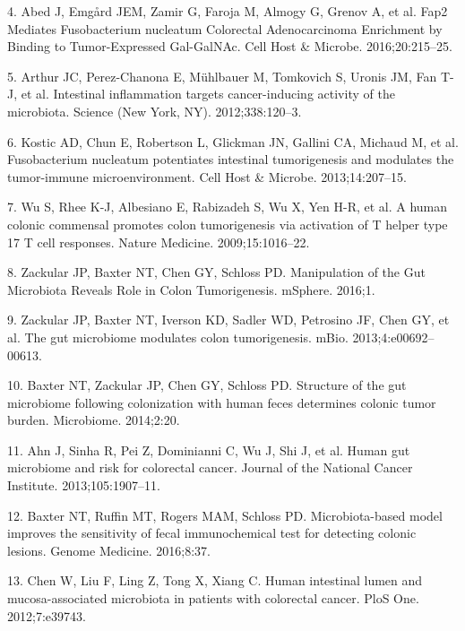 \documentclass[12pt,]{article}
\begin{document}
\hypertarget{ref-abed_fap2_2016}{}
4. Abed J, Emgård JEM, Zamir G, Faroja M, Almogy G, Grenov A, et al.
Fap2 Mediates Fusobacterium nucleatum Colorectal Adenocarcinoma
Enrichment by Binding to Tumor-Expressed Gal-GalNAc. Cell Host \&
Microbe. 2016;20:215--25.

\hypertarget{ref-arthur_intestinal_2012}{}
5. Arthur JC, Perez-Chanona E, Mühlbauer M, Tomkovich S, Uronis JM, Fan
T-J, et al. Intestinal inflammation targets cancer-inducing activity of
the microbiota. Science (New York, NY). 2012;338:120--3.

\hypertarget{ref-kostic_fusobacterium_2013}{}
6. Kostic AD, Chun E, Robertson L, Glickman JN, Gallini CA, Michaud M,
et al. Fusobacterium nucleatum potentiates intestinal tumorigenesis and
modulates the tumor-immune microenvironment. Cell Host \& Microbe.
2013;14:207--15.

\hypertarget{ref-wu_human_2009}{}
7. Wu S, Rhee K-J, Albesiano E, Rabizadeh S, Wu X, Yen H-R, et al. A
human colonic commensal promotes colon tumorigenesis via activation of T
helper type 17 T cell responses. Nature Medicine. 2009;15:1016--22.

\hypertarget{ref-zackular_manipulation_2016}{}
8. Zackular JP, Baxter NT, Chen GY, Schloss PD. Manipulation of the Gut
Microbiota Reveals Role in Colon Tumorigenesis. mSphere. 2016;1.

\hypertarget{ref-zackular_gut_2013}{}
9. Zackular JP, Baxter NT, Iverson KD, Sadler WD, Petrosino JF, Chen GY,
et al. The gut microbiome modulates colon tumorigenesis. mBio.
2013;4:e00692--00613.

\hypertarget{ref-baxter_structure_2014}{}
10. Baxter NT, Zackular JP, Chen GY, Schloss PD. Structure of the gut
microbiome following colonization with human feces determines colonic
tumor burden. Microbiome. 2014;2:20.

\hypertarget{ref-ahn_human_2013}{}
11. Ahn J, Sinha R, Pei Z, Dominianni C, Wu J, Shi J, et al. Human gut
microbiome and risk for colorectal cancer. Journal of the National
Cancer Institute. 2013;105:1907--11.

\hypertarget{ref-baxter_microbiota-based_2016}{}
12. Baxter NT, Ruffin MT, Rogers MAM, Schloss PD. Microbiota-based model
improves the sensitivity of fecal immunochemical test for detecting
colonic lesions. Genome Medicine. 2016;8:37.

\hypertarget{ref-chen_human_2012}{}
13. Chen W, Liu F, Ling Z, Tong X, Xiang C. Human intestinal lumen and
mucosa-associated microbiota in patients with colorectal cancer. PloS
One. 2012;7:e39743.
\end{document}
